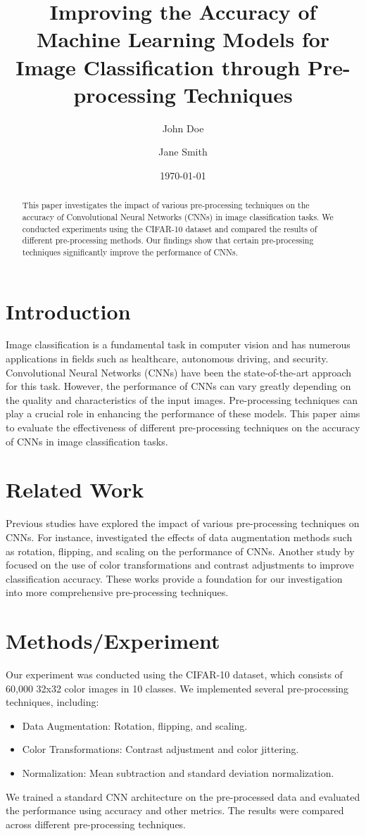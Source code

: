 \documentclass{article}
\title{Improving the Accuracy of Machine Learning Models for Image Classification through Pre-processing Techniques}
\author{John Doe \and Jane Smith}
\date{\today}
\begin{document}
\maketitle

\begin{abstract}
This paper investigates the impact of various pre-processing techniques on the accuracy of Convolutional Neural Networks (CNNs) in image classification tasks. We conducted experiments using the CIFAR-10 dataset and compared the results of different pre-processing methods. Our findings show that certain pre-processing techniques significantly improve the performance of CNNs.
\end{abstract}

\section{Introduction}
Image classification is a fundamental task in computer vision and has numerous applications in fields such as healthcare, autonomous driving, and security. Convolutional Neural Networks (CNNs) have been the state-of-the-art approach for this task. However, the performance of CNNs can vary greatly depending on the quality and characteristics of the input images. Pre-processing techniques can play a crucial role in enhancing the performance of these models. This paper aims to evaluate the effectiveness of different pre-processing techniques on the accuracy of CNNs in image classification tasks.

\section{Related Work}
Previous studies have explored the impact of various pre-processing techniques on CNNs. For instance, \cite{DBLP:journals/corr/abs-1807-01681} investigated the effects of data augmentation methods such as rotation, flipping, and scaling on the performance of CNNs. Another study by \cite{DBLP:conf/iccv/WangZ19} focused on the use of color transformations and contrast adjustments to improve classification accuracy. These works provide a foundation for our investigation into more comprehensive pre-processing techniques.

\section{Methods/Experiment}
Our experiment was conducted using the CIFAR-10 dataset, which consists of 60,000 32x32 color images in 10 classes. We implemented several pre-processing techniques, including:
\begin{itemize}
    \item Data Augmentation: Rotation, flipping, and scaling.
    \item Color Transformations: Contrast adjustment and color jittering.
    \item Normalization: Mean subtraction and standard deviation normalization.
\end{itemize}
We trained a standard CNN architecture on the pre-processed data and evaluated the performance using accuracy and other metrics. The results were compared across different pre-processing techniques.
\end{document}
